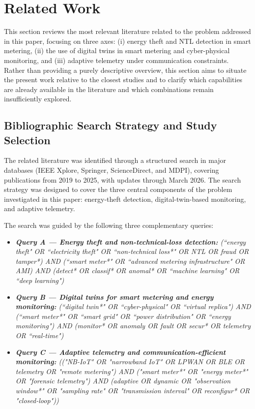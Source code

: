 \documentclass{ieeeaccess}
\begin{document}
\section{Related Work}
\label{sec:related_work}
This section reviews the most relevant literature related to the problem addressed in this paper, focusing on three axes: (i) energy theft and NTL detection in smart metering, (ii) the use of digital twins in smart metering and cyber-physical monitoring, and (iii) adaptive telemetry under communication constraints. Rather than providing a purely descriptive overview, this section aims to situate the present work relative to the closest studies and to clarify which capabilities are already available in the literature and which combinations remain insufficiently explored.

\subsection{Bibliographic Search Strategy and Study Selection}
The related literature was identified through a structured search in major databases (IEEE Xplore, Springer, ScienceDirect, and MDPI), covering publications from 2019 to 2025, with updates through March 2026. The search strategy was designed to cover the three central components of the problem investigated in this paper: energy-theft detection, digital-twin-based monitoring, and adaptive telemetry.

The search was guided by the following three complementary queries:
\begin{itemize}
    \item \textit{\textbf{Query A --- Energy theft and non-technical-loss detection:} (``energy theft" OR ``electricity theft" OR ``non-technical loss*" OR NTL OR fraud OR tamper*) AND (``smart meter*" OR ``advanced metering infrastructure" OR AMI) AND (detect* OR classif* OR anomal* OR ``machine learning" OR ``deep learning")}
    \item \textit{\textbf{Query B --- Digital twins for smart metering and energy monitoring:} (``digital twin*" OR ``cyber-physical" OR ``virtual replica") AND (``smart meter*" OR ``smart grid" OR ``power distribution" OR ``energy monitoring") AND (monitor* OR anomaly OR fault OR secur* OR telemetry OR ``real-time")}
    \item \textit{\textbf{Query C --- Adaptive telemetry and communication-efficient monitoring:} (("NB-IoT" OR "narrowband IoT" OR LPWAN OR BLE OR telemetry OR "remote metering") AND ("smart meter*" OR "energy meter*" OR "forensic telemetry") AND (adaptive OR dynamic OR "observation window*" OR "sampling rate" OR "transmission interval" OR reconfigur* OR "closed-loop"))}
\end{itemize}
\end{document}

